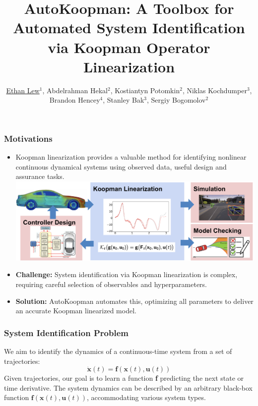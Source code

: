\documentclass[shortpres,aspectratio=43]{beamer}
\title[AutoKoopman]{AutoKoopman: A Toolbox for Automated System Identification via Koopman Operator Linearization}
\author[Lew et al.]{\underline{Ethan Lew}$^1$, Abdelrahman Hekal$^2$, Kostiantyn Potomkin$^2$, Niklas Kochdumper$^3$, Brandon Hencey$^4$, Stanley Bak$^3$, Sergiy Bogomolov$^2$}
\institute[Galois Inc.]{$^1$Galois Inc., $^2$Newcastle University, \\$^3$ Stony Brook University, $^4$Air Force Research Laboratory}
\date[ATVA 2023]{}
\begin{document}

\begin{frame}[plain]
    \titlepage
\end{frame}

\begin{frame}
\frametitle{Motivations}

\begin{itemize}
    \item<1-> Koopman linearization provides a valuable method for identifying nonlinear continuous dynamical systems using observed data, useful design and assurance tasks.
	\includegraphics[width=\linewidth]{./img/koopman.png}
    \item<2-> \textbf{Challenge:} System identification via Koopman linearization is complex, requiring careful selection of observables and hyperparameters.
    \item<3-> \textbf{Solution:} AutoKoopman automates this, optimizing all parameters to deliver an accurate Koopman linearized model.
\end{itemize}
\end{frame}

\begin{frame}
\frametitle{System Identification Problem}
We aim to identify the dynamics of a continuous-time system from a set of trajectories:
\begin{equation}
\dot{\mathbf{x}}(t) = \mathbf{f}(\mathbf{x}(t), \mathbf{u}(t))
\end{equation}
\pause
Given trajectories, our goal is to learn a function \textbf{f} predicting the next state or time derivative. The system dynamics can be described by an arbitrary black-box function $\mathbf{f}(\mathbf{x}(t), \mathbf{u}(t))$, accommodating various system types.
\end{frame}
\end{document}
